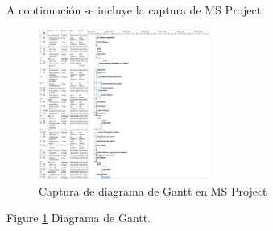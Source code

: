 \par A continuación se incluye la captura de MS Project:
\begin{figure}
  \centering
    \includegraphics[width=0.5\textwidth]{./img/gantt.png}
  \caption{Captura de diagrama de Gantt en MS Project}
  \label{fig:gantt}
\end{figure}
Figure \ref{fig:gantt} Diagrama de Gantt.